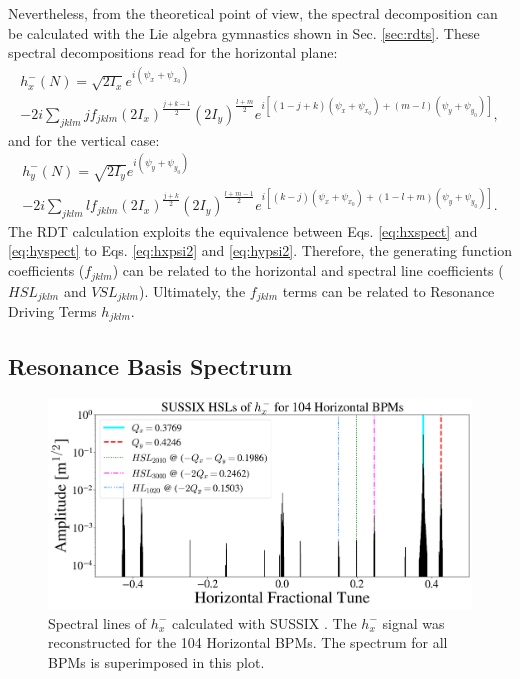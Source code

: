 Nevertheless, from the theoretical point of view, the spectral decomposition can be calculated with the Lie algebra gymnastics shown in Sec. \ref{sec:rdts}. These spectral decompositions read for the horizontal plane:
\begin{multline}
    \label{eq:hxpsi2}
    h_x^{-}(N)=\sqrt{2I_x}e^{i\left( \psi_x+\psi_{x_0}\right)} \\
    -2i \sum_{jklm} j f_{jklm} \left( 2I_x \right)^{\frac{j+k-1}{2}}\left( 2I_y \right)^{\frac{l+m}{2}}
    e^{i \left[ \left( 1-j+k\right)\left( \psi_x + \psi_{x_0} \right) +\left( m-l\right)\left( \psi_y + \psi_{y_0} \right)\right]},
\end{multline}
and for the vertical case:
\begin{multline}
    \label{eq:hypsi2}
    h_y^{-}(N)=\sqrt{2I_y}e^{i\left( \psi_y+\psi_{y_0}\right)} \\
    -2i \sum_{jklm} l f_{jklm} \left( 2I_x \right)^{\frac{j+k}{2}}\left( 2I_y \right)^{\frac{l+m-1}{2}}
    e^{i \left[ \left( k-j\right)\left( \psi_x + \psi_{x_0} \right) +\left( 1-l+m\right)\left( \psi_y + \psi_{y_0} \right)\right]}.
\end{multline}
The RDT calculation exploits the equivalence between Eqs. \ref{eq:hxspect} and \ref{eq:hyspect} to Eqs. \ref{eq:hxpsi2} and \ref{eq:hypsi2}. Therefore, the generating function coefficients ($f_{jklm}$) can be related to the horizontal and spectral line coefficients ($HSL_{jklm}$ and $VSL_{jklm}$). Ultimately, the $f_{jklm}$ terms can be related to Resonance Driving Terms $h_{jklm}$.

\subsection{Resonance Basis Spectrum}

\begin{figure}[H]
    \centering
    \includegraphics[width=\columnwidth]{chapter4/hxspect.png}
    \caption{Spectral lines of $h_x^{-}$ calculated with SUSSIX \cite{sussix}. The $h_x^{-}$ signal was reconstructed for the 104 Horizontal BPMs. The spectrum for all BPMs is superimposed in this plot.}
    \label{fig:hxspect1}
\end{figure}

